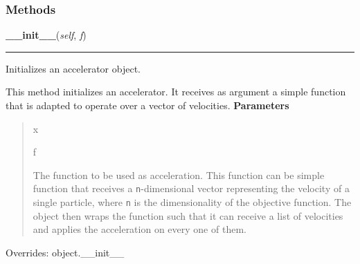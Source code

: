 
  \subsubsection{Methods}

    \vspace{0.5ex}

\hspace{.8\funcindent}\begin{boxedminipage}{\funcwidth}

    \raggedright \textbf{\_\_init\_\_}(\textit{self}, \textit{f})

    \vspace{-1.5ex}

    \rule{\textwidth}{0.5\fboxrule}
\setlength{\parskip}{2ex}

Initializes an accelerator object.

This method initializes an accelerator. It receives as argument a simple
function that is adapted to operate over a vector of velocities.
\setlength{\parskip}{1ex}
      \textbf{Parameters}
      \vspace{-1ex}

      \begin{quote}
        \begin{Ventry}{x}

          \item[f]


The function to be used as acceleration. This function can be simple
function that receives a \texttt{n}-dimensional vector representing the
velocity of a single particle, where \texttt{n} is the dimensionality of
the objective function. The object then wraps the function such that
it can receive a list of velocities and applies the acceleration on
every one of them.
        \end{Ventry}

      \end{quote}

      Overrides: object.\_\_init\_\_

    \end{boxedminipage}

    \label{peach:pso:acc:Accelerator:__call__}

